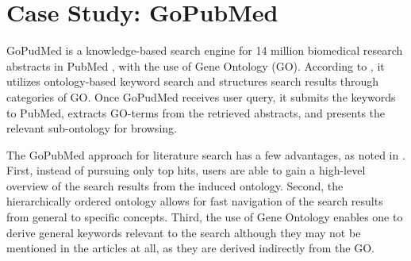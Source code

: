 \section{Case Study: GoPubMed}
GoPudMed is a knowledge-based search engine for 14 million biomedical research abstracts in PubMed \cite{Delfs2005}, with the use of Gene Ontology (GO). According to \citet{Delfs2005}, it utilizes ontology-based keyword search and structures search results through categories of GO. Once GoPudMed receives user query, it submits the keywords to PubMed, extracts GO-terms from the retrieved abstracts, and presents the relevant sub-ontology for browsing. 

The GoPubMed approach for literature search has a few advantages, as noted in \cite{Delfs2005}. First, instead of pursuing only top hits, users are able to gain a high-level overview of the search results from the induced ontology. Second, the hierarchically ordered ontology allows for fast navigation of the search results from general to specific concepts. Third, the use of Gene Ontology enables one to derive general keywords relevant to the search although they may not be mentioned in the articles at all, as they are derived indirectly from the GO.